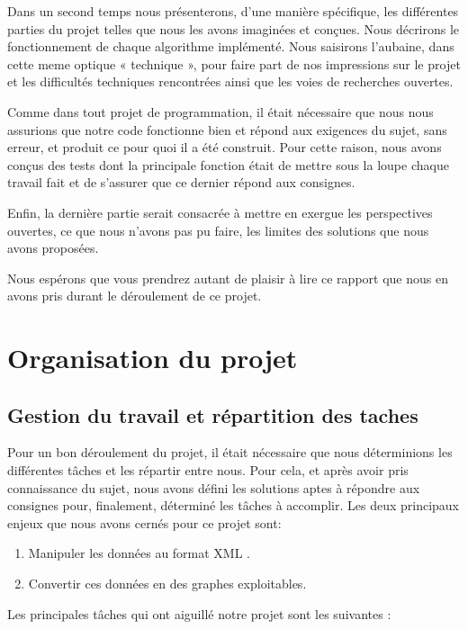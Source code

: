 \documentclass[french]{article}
\begin{document}
Dans un second temps nous présenterons, d’une manière spécifique, les différentes parties du projet telles que nous les avons imaginées et conçues. Nous décrirons le fonctionnement de chaque algorithme implémenté. Nous saisirons l’aubaine, dans cette meme optique « technique », pour faire part de nos impressions sur le projet et les difficultés techniques rencontrées ainsi que les voies de recherches ouvertes.\newline

Comme dans tout projet de programmation, il était nécessaire que nous nous assurions que notre code fonctionne bien et répond aux exigences du sujet, sans erreur, et produit ce pour quoi il a été construit. Pour cette raison, nous avons conçus des tests dont la principale fonction était de mettre sous la loupe chaque travail fait et de s’assurer que ce dernier répond aux consignes.\newline

Enfin, la dernière partie serait consacrée à mettre en exergue les perspectives ouvertes, ce que nous n’avons pas pu faire, les limites des solutions que nous avons proposées.\newline

Nous espérons que vous prendrez autant de plaisir à lire ce rapport que nous en avons pris durant le déroulement de ce projet. 

\newpage
\section{Organisation du projet}
\subsection{Gestion du travail et répartition des taches} %
Pour un bon déroulement du projet, il était nécessaire que nous déterminions les différentes tâches et les répartir entre nous. Pour cela, et après avoir pris connaissance du sujet, nous avons défini les solutions aptes à répondre aux consignes pour, finalement, déterminé les tâches à accomplir. \newline 
Les deux principaux enjeux que nous avons cernés pour ce projet sont: 

\begin{enumerate}
\item Manipuler les données au format XML .  
\item Convertir ces données en des graphes exploitables.
\end{enumerate} 
Les principales tâches qui ont aiguillé notre projet sont les suivantes : \newline
\end{document}
